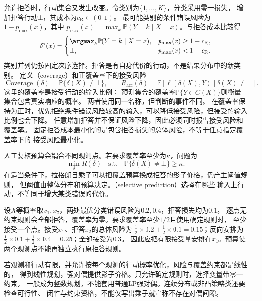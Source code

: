 允许拒答时，行动集合又发生改变。令类别为$\{1,\ldots,K\}$，分类采用零一损失，
增加拒答行动$\bot$，其成本为$c_{\mathrm R}\in(0,1)$。
最可能类别的条件错误风险为$1-p_{\max}(x)$，其中
$p_{\max}(x)=\max_k\mathbb P(Y=k\mid X=x)$。与拒答成本比较得
\begin{equation}
  \delta^\star(x)=
  \begin{cases}
    \argmax_k\mathbb P(Y=k\mid X=x),&p_{\max}(x)\geq1-c_{\mathrm R},\\
    \bot,&p_{\max}(x)<1-c_{\mathrm R}.
  \end{cases}
  \label{eq:decision-reject-rule}
\end{equation}
类别并列仍按固定次序选择。拒答是有自身代价的行动，不是结果分布中的新类别。
定义（coverage）和正覆盖率下的接受风险
\[
  \operatorname{Coverage}(\delta)=\mathbb P\{\delta(X)\neq\bot\},\qquad
  R_{\mathrm{acc}}(\delta)
  =\mathbb E[\ell(\delta(X),Y)\mid\delta(X)\neq\bot].
\]
这里的覆盖率是接受行动的输入比例；
预测集合的覆盖率$\mathbb P\{Y\in C(X)\}$则衡量集合包含真实响应的概率。
两者使用同一名称，但判断的事件不同。
在覆盖率保持为正时，优先拒绝条件错误风险较高的输入，可以降低接受风险，但接受的输入比例也会下降。
任意增加拒答并不保证风险下降，因此必须同时报告接受风险和覆盖率。
固定拒答成本最小化的是包含拒答损失的总体风险，不等于任意指定覆盖率下的
接受风险最小化。

人工复核预算会耦合不同观测点。若要求覆盖率至少为$\kappa$，问题为
\[
  \min_\delta R(\delta)
  \quad\text{s.t.}\quad\mathbb P\{\delta(X)\neq\bot\}\geq\kappa.
\]
在适当条件下，拉格朗日乘子可以把覆盖预算换成拒答的影子价格，仍产生阈值规则，
但阈值由整体分布和预算决定。（selective prediction）选择在哪些
输入上行动，不等同于增大某类错误的代价。

\begin{example}[覆盖预算耦合两个观测点]
\label{ex:decision-two-point-coverage-budget}
设$X$等概率取$x_1,x_2$，两处最优分类错误风险为$0.2,0.4$，拒答损失均为$0.1$。
逐点无约束规则会全部拒答，覆盖率为零。要求覆盖率至少$1/2$且使用确定规则时，
至少接受一个点。接受$x_1$、拒答$x_2$的总体风险为
$\tfrac12\times0.2+\tfrac12\times0.1=0.15$；反向安排为
$\tfrac12\times0.1+\tfrac12\times0.4=0.25$；全部接受为$0.3$。
因此应把有限接受量安排在$x_1$。预算使两个观测点不能再独立执行原拒答规则。
\end{example}

若观测和行动有限，并允许按每个观测的行动概率优化，风险与覆盖约束都是线性的，
得到线性规划，强对偶提供影子价格。只允许确定规则时，选择变量带零一约束，
一般成为整数规划，不能套用普通LP强对偶。连续分布或非凸策略类还要检查可行性、
闭性与约束资格，不能仅写出乘子就宣称不存在对偶间隙。

